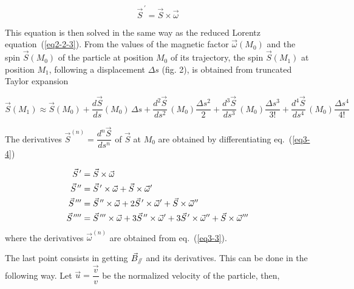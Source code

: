  \begin{equation}
	 \vec  S^{\,\prime}  = \vec  S \times  \vec  \omega
 	\label{eq3-4}
 \end{equation}
 
\noindent This equation is then solved in the same way as the reduced Lorentz 
equation~(\ref{eq2-2-3}). 
From the values of the magnetic factor $ \vec  \omega (M_0) $ and the spin 
$\vec  S(M_0) $ 
of the particle at position $ M_0 $ of its trajectory, the spin $ \vec  S(M_1)$ 
at position $ M_1 $, following a displacement $ \Delta s$ (fig. 2), is obtained from truncated 
Taylor expansion 

 \begin{equation}
	 \vec  S(M_1) \approx \vec  S(M_0)+ \dfrac{d\vec  S }{ ds} (M_0)\, \Delta s
	 + \dfrac{d^2\vec  S }{ds^2} \,(M_0) \dfrac{\Delta s^2 }{ 2} 
	 + \dfrac{d^3\vec  S }{ ds^3} \,(M_0) \dfrac{\Delta s^3 }{ 3!}
	+ \dfrac{d^4\vec  S }{ ds^4}\, (M_0) \dfrac{\Delta s^4 }{ 4!}
 	\label{eq3-5}
 \end{equation}
 
\noindent The derivatives $ \vec  S^{(n)} = \dfrac{d^n\vec  S }{ ds^n} $ of 
$\vec  S $ at $ M_0 $ are obtained by differentiating eq.~(\ref{eq3-4})

 \begin{equation}
	 \begin{aligned}
		 \vec  S^{\,\prime}  
		      &  =\vec  S\times\vec  \omega \\
		\vec  S^{\,\prime\prime} 
		      &  =\vec  S^{\,\prime} \times\vec  \omega +\vec  S\times\vec  \omega ^\prime \\
		\vec  S^{\,\prime\prime\prime}
		      &  =\vec  S^{\,\prime\prime} \times\vec  \omega +2\vec  S^{\,\prime} \times\vec  \omega ^\prime 
		           +\vec S\times\vec  \omega^{\prime\prime} \\
		\vec  S^{\,\prime\prime\prime\prime} 
		      & =\vec S^{\,\prime\prime\prime} \times\vec  \omega 
		          +3\vec  S^{\,\prime\prime} \times\vec \omega^\prime 
		          +3\vec  S^{\,\prime} \times\vec  \omega^{\prime\prime} 
		          +\vec S\times\vec  \omega^{\prime\prime\prime}
	 \end{aligned}
 	\label{eq3-6}
 \end{equation}
  where the derivatives $ \vec  \omega^{(n)} $ are obtained from eq.~(\ref{eq3-3}). 
  
\noindent The last point consists in getting $ \vec  B_{\mathrel{/\kern-.25em/}} $ and its
derivatives. 
This can be done in the following way. 
Let $ \vec  u=\dfrac{\vec  v }{ v} $ be the normalized velocity of the particle,
then,

